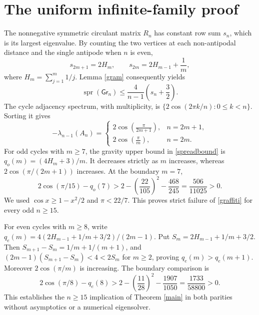 \documentclass[10pt,twocolumn]{article}
\newcommand{\Gr}{\mathsf{Gr}}
\newcommand{\spr}{\operatorname{spr}}
\begin{document}
\section{The uniform infinite-family proof}
The nonnegative symmetric circulant matrix $R_n$ has constant row sum $s_n$, which is its largest eigenvalue. By counting the two vertices at each non-antipodal distance and the single antipode when $n$ is even,
\begin{equation}\label{rowsum}
s_{2m+1}=2H_m,\qquad s_{2m}=2H_{m-1}+\frac1m,
\end{equation}
where $H_m=\sum_{j=1}^m1/j$. Lemma \ref{gram} consequently yields
\begin{equation}\label{spreadbound}
\spr(\Gr_n)\le\frac4{n-1}\left(s_n+\frac32\right).
\end{equation}
The cycle adjacency spectrum, with multiplicity, is $\{2\cos(2\pi k/n):0\le k<n\}$. Sorting it gives
\begin{equation}\label{adjordered}
-\lambda_{n-1}(A_n)=\begin{cases}
2\cos\!\left(\frac\pi{2m+1}\right),&n=2m+1,\\[1pt]
2\cos\!\left(\frac\pi m\right),&n=2m.
\end{cases}
\end{equation}
For odd cycles with $m\ge7$, the gravity upper bound in \eqref{spreadbound} is $q_o(m)=(4H_m+3)/m$. It decreases strictly as $m$ increases, whereas $2\cos(\pi/(2m+1))$ increases. At the boundary $m=7$,
\begin{equation}\label{oddmargin}
2\cos(\pi/15)-q_o(7)
>2-\left(\frac{22}{105}\right)^2-\frac{468}{245}
=\frac{506}{11025}>0.
\end{equation}
We used $\cos x\ge1-x^2/2$ and $\pi<22/7$. This proves strict failure of \eqref{graffiti} for every odd $n\ge15$.

For even cycles with $m\ge8$, write
$q_e(m)=4(2H_{m-1}+1/m+3/2)/(2m-1)$. Put $S_m=2H_{m-1}+1/m+3/2$. Then $S_{m+1}-S_m=1/m+1/(m+1)$, and
$(2m-1)(S_{m+1}-S_m)<4<2S_m$ for $m\ge2$, proving $q_e(m)>q_e(m+1)$. Moreover $2\cos(\pi/m)$ is increasing. The boundary comparison is
\begin{equation}\label{evenmargin}
2\cos(\pi/8)-q_e(8)
>2-\left(\frac{11}{28}\right)^2-\frac{1907}{1050}
=\frac{1733}{58800}>0.
\end{equation}
This establishes the $n\ge15$ implication of Theorem \ref{main} in both parities without asymptotics or a numerical eigensolver.
\end{document}
